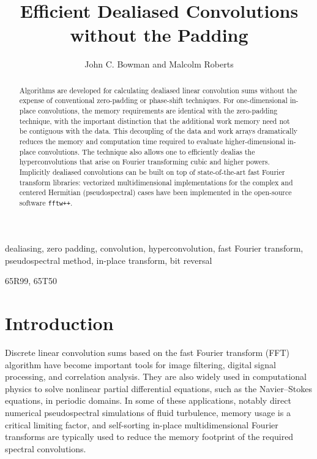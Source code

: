 \documentclass[final]{siamltex}
\begin{document}
\title{Efficient Dealiased Convolutions without the Padding}
\author{John C. Bowman and Malcolm Roberts}
\maketitle

\begin{abstract}
Algorithms are developed for calculating dealiased linear convolution sums
without the expense of conventional zero-padding or phase-shift
techniques. For one-dimensional in-place convolutions, the memory
requirements are identical with the zero-padding technique, with the important
distinction that the additional work memory need not be contiguous with the
data. This decoupling of the data and work arrays dramatically reduces
the memory and computation time required to evaluate higher-dimensional
in-place convolutions. The technique also allows one to efficiently dealias the
hyperconvolutions that arise on Fourier transforming cubic and higher powers.
Implicitly dealiased convolutions can be built on top of state-of-the-art
fast Fourier transform libraries: vectorized multidimensional implementations
for the complex and centered Hermitian (pseudospectral) cases have
been implemented in the open-source software {\tt fftw++}.
\end{abstract} 

\begin{keywords} 
dealiasing, zero padding, convolution, hyperconvolution, fast Fourier transform,
pseudospectral method, in-place transform, bit reversal
\end{keywords}

\begin{AMS}
65R99, 65T50
\end{AMS}

\pagestyle{myheadings}



\section{Introduction}
Discrete linear convolution sums based on the fast Fourier transform
(FFT) algorithm \cite{Gauss1866,Cooley65} have become important tools
for image filtering, digital signal processing, and correlation
analysis. They are also widely used in computational physics to solve
nonlinear partial differential equations, such as the Navier--Stokes
equations, in periodic domains. In some of these applications, notably
direct numerical pseudospectral simulations of fluid turbulence,
memory usage is a critical limiting factor, and self-sorting in-place
multidimensional Fourier transforms \cite{Temperton91} are typically used to
reduce the memory footprint of the required spectral convolutions.
\end{document}
